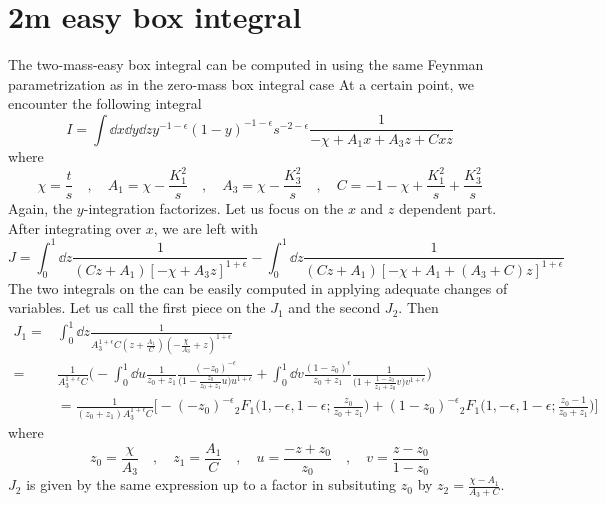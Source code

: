 \section{2m easy box integral}
The two-mass-easy box integral can be computed in using the same Feynman parametrization as in the zero-mass box integral case
At a certain point, we encounter the following integral
\begin{equation*}
I = \int\dd x\dd y \dd z y^{-1-\epsilon}(1-y)^{-1-\epsilon}s^{-2-\epsilon}
\frac{1}{-\chi + A_1 x + A_3 z + C xz}
\end{equation*}
where
\begin{equation*}
\chi = \frac{t}{s}\quad, \quad
A_1 = \chi - \frac{K_1^2}{s}\quad, \quad
A_3 = \chi - \frac{K_3^2}{s} \quad,\quad
C = -1 - \chi  + \frac{K_1^2}{s} + \frac{K_3^2}{s}
\end{equation*}
Again, the $y$-integration factorizes. Let us focus on the $x$ and $z$ dependent part.
After integrating over $x$, we are left with 
\begin{equation*}
J = \int^1_0\dd z\frac{1}{(Cz + A_1)[-\chi + A_3z]^{1+\epsilon}} - 
\int^1_0\dd z\frac{1}{(Cz + A_1)[-\chi + A_1  + (A_3 + C)z]^{1+\epsilon} }
\end{equation*}
The two integrals on the \rhs can be easily computed in applying adequate changes of variables.
Let us call the first piece on the \rhs $J_1$ and the second $J_2$.
Then
\begin{equation*}
\begin{split}
J_1 = & \int^1_0 \dd z \frac{1}{A_3^{1+\epsilon}C(z + \frac{A_1}{C})(-\frac{\chi}{A_3} + z)^{1+\epsilon}} 
\\
= &
\frac{1}{A_3^{1+\epsilon}C}\Big(
-\int^1_0 \dd u \frac{1}{z_0 + z_1}\frac{(-z_0)^{-\epsilon}}{\big(1-\frac{z_0}{z_0 + z_1}u\big) u^{1+\epsilon}} +
\int^1_0\dd v \frac{(1-z_0)^{\epsilon}}{z_0 + z_1}\frac{1}{\big(1+ \frac{1-z_0}{z_1 + z_0}v\big)v^{1+\epsilon}}\Big)
\\
& = 
\frac{1}{(z_0 + z_1 )A_3^{1+\epsilon}C}
\Big[-(-z_0)^{-\epsilon}{}_2F_1\big(1,-\epsilon, 1-\epsilon; \frac{z_0}{z_0 + z_1}\big)
+ (1-z_0)^{-\epsilon}{}_2F_1\big(1, -\epsilon, 1-\epsilon; \frac{z_0 -1}{z_0 + z_1}\big)\Big]
\end{split}
\end{equation*}
where
\begin{equation*}
z_0 = \frac{\chi}{A_3} \quad, \quad z_1 = \frac{A_1}{C}
\quad,\quad
u=\frac{-z + z_0}{z_0}\quad,\quad
v=\frac{z-z_0}{1-z_0}
\end{equation*}
$J_2$ is given by the same expression up to a factor in subsituting $z_0$ by $z_2 = \frac{\chi - A_1}{A_3 + C}$. 
%
%
%
